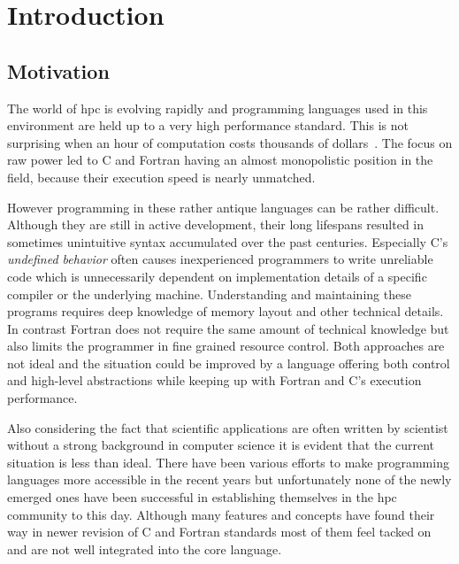 \chapter{Introduction}
\label{ch:Introduction}


\section{Motivation}
\label{sec:Introduction::Motivation}

The world of \acrlong{hpc} is evolving rapidly and programming languages used in this environment are held up to a very high performance standard. This is not surprising when an hour of computation costs thousands of dollars~\cite{cost_of_science}. The focus on raw power led to C and Fortran having an almost monopolistic position in the field, because their execution speed is nearly unmatched.

However programming in these rather antique languages can be rather difficult. Although they are still in active development, their long lifespans resulted in sometimes unintuitive syntax accumulated over the past centuries. Especially C's \textit{undefined behavior} often causes inexperienced programmers to write unreliable code which is unnecessarily dependent on implementation details of a specific compiler or the underlying machine. Understanding and maintaining these programs requires deep knowledge of memory layout and other technical details. In contrast Fortran does not require the same amount of technical knowledge but also limits the programmer in fine grained resource control. Both approaches are not ideal and the situation could be improved by a language offering both control and high-level abstractions while keeping up with Fortran and C's execution performance.

Also considering the fact that scientific applications are often written by scientist without a strong background in computer science it is evident that the current situation is less than ideal. There have been various efforts to make programming languages more accessible in the recent years but unfortunately none of the newly emerged ones have been successful in establishing themselves in the \gls{hpc} community to this day. Although many features and concepts have found their way in newer revision of C and Fortran standards most of them feel tacked on and are not well integrated into the core language.

